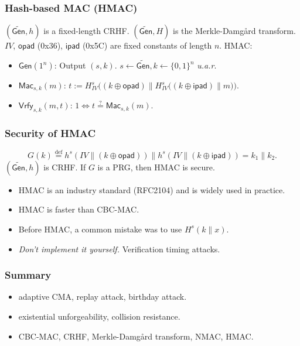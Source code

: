 \begin{frame}\frametitle{Hash-based MAC (HMAC)}
\begin{figure}
\begin{center}

\end{center}
\end{figure}
\begin{construction}
$(\widetilde{\mathsf{Gen}}, h)$ is a fixed-length CRHF. $(\widetilde{\mathsf{Gen}}, H)$ is the Merkle-Damg\r{a}rd transform.
$IV$, $\mathsf{opad}$ (0x36), $\mathsf{ipad}$ (0x5C) are fixed constants of length $n$.
HMAC:
\begin{itemize}
\item $\mathsf{Gen}(1^n)$: Output $(s, k)$. $s \gets \widetilde{\mathsf{Gen}}, k \gets \{0,1\}^n$ \emph{u.a.r}.
\item $\mathsf{Mac}_{s,k}(m)$: $t := H_{IV}^s\Big((k \oplus \mathsf{opad}) \| H_{IV}^s\big((k \oplus \mathsf{ipad}) \| m\big)\Big)$.
\item $\mathsf{Vrfy}_{s,k}(m,t)$: $1 \iff t \overset{?}{=} \mathsf{Mac}_{s,k}(m)$.
\end{itemize}
\end{construction}
\end{frame}
\begin{frame}\frametitle{Security of HMAC}
\begin{theorem}
\[ G(k) \overset{\text{def}}{=} h^s(IV\| (k\oplus \mathsf{opad})) \| 
h^s(IV\| (k\oplus \mathsf{ipad})) = k_1\| k_2.
\]
$(\widetilde{\mathsf{Gen}}, h)$ is CRHF. If $G$ is a PRG, then HMAC is secure.
\end{theorem}
\begin{itemize}
\item HMAC is an industry standard (RFC2104) and is widely used in practice.
\item HMAC is faster than CBC-MAC.
\item Before HMAC, a common mistake was to use $H^s(k\|x)$.
\item \emph{Don't implement it yourself.} \alert{Verification timing attacks.}
\end{itemize}
\end{frame}
\begin{frame}\frametitle{Summary}
\begin{itemize}
\item adaptive CMA, replay attack, birthday attack.
\item existential unforgeability, collision resistance.
\item CBC-MAC, CRHF, Merkle-Damg\r{a}rd transform, NMAC, HMAC. 
\end{itemize}
\end{frame}
